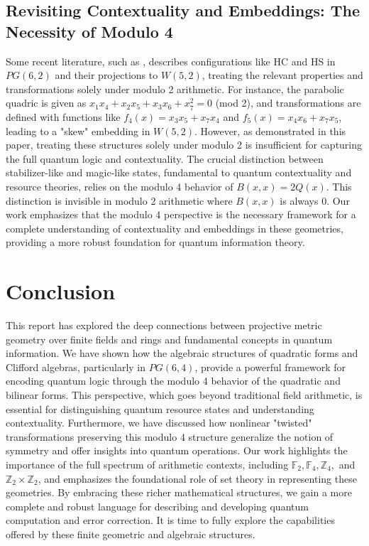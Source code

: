 \documentclass{article}
\begin{document}
\subsection{Revisiting Contextuality and Embeddings: The Necessity of Modulo 4}
Some recent literature, such as \cite{Holweck2018Contextuality}, describes configurations like HC and HS in $PG(6,2)$ and their projections to $W(5,2)$, treating the relevant properties and transformations solely under modulo 2 arithmetic. For instance, the parabolic quadric is given as $x_1x_4 + x_2x_5 + x_3x_6 + x_7^2 = 0$ (mod 2), and transformations are defined with functions like $f_4(x) = x_3x_5 + x_7x_4$ and $f_5(x) = x_4x_6 + x_7x_5$, leading to a "skew" embedding in $W(5,2)$. However, as demonstrated in this paper, treating these structures solely under modulo 2 is insufficient for capturing the full quantum logic and contextuality. The crucial distinction between stabilizer-like and magic-like states, fundamental to quantum contextuality and resource theories, relies on the modulo 4 behavior of $B(x,x) = 2Q(x)$. This distinction is invisible in modulo 2 arithmetic where $B(x,x)$ is always 0. Our work emphasizes that the modulo 4 perspective is the necessary framework for a complete understanding of contextuality and embeddings in these geometries, providing a more robust foundation for quantum information theory.

\section{Conclusion}
This report has explored the deep connections between projective metric geometry over finite fields and rings and fundamental concepts in quantum information. We have shown how the algebraic structures of quadratic forms and Clifford algebras, particularly in $PG(6,4)$, provide a powerful framework for encoding quantum logic through the modulo 4 behavior of the quadratic and bilinear forms. This perspective, which goes beyond traditional field arithmetic, is essential for distinguishing quantum resource states and understanding contextuality. Furthermore, we have discussed how nonlinear "twisted" transformations preserving this modulo 4 structure generalize the notion of symmetry and offer insights into quantum operations. Our work highlights the importance of the full spectrum of arithmetic contexts, including $\mathbb{F}_2, \mathbb{F}_4, \mathbb{Z}_4,$ and $\mathbb{Z}_2 \times \mathbb{Z}_2$, and emphasizes the foundational role of set theory in representing these geometries. By embracing these richer mathematical structures, we gain a more complete and robust language for describing and developing quantum computation and error correction. It is time to fully explore the capabilities offered by these finite geometric and algebraic structures.
\end{document}

